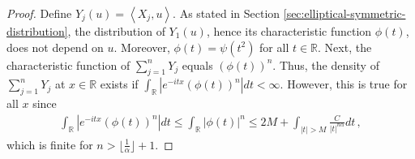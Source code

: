 \documentclass[12pt]{article}
\def\l{\left}
\def\r{\right}
\newcommand{\mb}{\mathbb}
\newcommand{\dotp}[2]{\left\langle#1,#2\right\rangle}
\theoremstyle{thmstyletwo}%
\theoremstyle{thmstylethree}%
\begin{document}
\begin{proof}
    Define $Y_j(u) = \dotp{X_j}{u}$. As stated in Section \ref{sec:elliptical-symmetric-distribution}, the distribution of $Y_1(u)$, hence its characteristic function $\phi(t)$, does not depend on $u$. Moreover, $\phi(t) = \psi(t^2)$ for all $t \in \mb R$. Next, the characteristic function of $\sum_{j=1}^n Y_j$ equals $\l(\phi(t)\r)^n$. Thus, the density of $\sum_{j=1}^n Y_j$ at $x \in \mb R$ exists if $\int_{\mb R} \l| e^{-itx} \l(\phi(t)\r)^n \r| dt < \infty$. However, this is true for all $x$ since
    \begin{align*}
        \int_{\mb R} \l\lvert e^{-itx} \l(\phi(t)\r)^n \r\rvert dt \leq \int_{\mb R} \lvert \phi(t) \rvert^n \leq 2M + \int_{\lvert t \rvert > M} \frac{C}{\lvert t\rvert^{n\alpha}} dt\,,
    \end{align*}
    which is finite for $n > \lfloor\frac{1}{\alpha}\rfloor+1$.
    

\end{proof}
\end{document}
